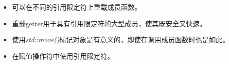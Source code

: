 \begin{itemize}
	\item 可以在不同的引用限定符上重载成员函数。
	\item 重载getter用于具有引用限定符的大型成员，使其既安全又快速。
	\item 使用\textit{std::move()}标记对象是有意义的，即使在调用成员函数时也是如此。
	\item 在赋值操作符中使用引用限定符。
\end{itemize}


\newpage